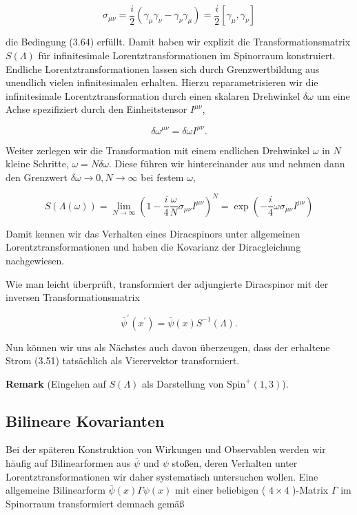 \documentclass[10pt, letterpaper]{article}
\newcommand{\Spin}{\mathrm{Spin}}
\newcommand{\CustomHeading}[3]{%
  \par\medskip\noindent%
  \textbf{#1 #2} \textnormal{(#3)}.\enskip%
}
\newenvironment{REM}[2]{\begin{unitbox}\CustomHeading{Remark}{#1}{#2}}{\end{unitbox}}
\begin{document}
$$
\sigma_{\mu \nu}=\frac{i}{2}\left(\gamma_{\mu} \gamma_{\nu}-\gamma_{\nu} \gamma_{\mu}\right)=\frac{i}{2}\left[\gamma_{\mu}, \gamma_{\nu}\right]
$$

die Bedingung (3.64) erfüllt. Damit haben wir explizit die Transformationsmatrix $S(\Lambda)$ für infinitesimale Lorentztransformationen im Spinorraum konstruiert. Endliche Lorentztransformationen lassen sich durch Grenzwertbildung aus unendlich vielen infinitesimalen erhalten. Hierzu reparametrisieren wir die infinitesimale Lorentztransformation durch einen skalaren Drehwinkel $\delta \omega$ um eine Achse spezifiziert durch den Einheitstensor $I^{\mu \nu}$,

$$
\delta \omega^{\mu \nu}=\delta \omega I^{\mu \nu} .
$$

Weiter zerlegen wir die Transformation mit einem endlichen Drehwinkel $\omega$ in $N$ kleine Schritte, $\omega=N \delta \omega$. Diese führen wir hintereinander aus und nehmen dann den Grenzwert $\delta \omega \rightarrow 0, N \rightarrow \infty$ bei festem $\omega$,

$$
S(\Lambda(\omega))=\lim _{N \rightarrow \infty}\left(1-\frac{i}{4} \frac{\omega}{N} \sigma_{\mu \nu} I^{\mu \nu}\right)^{N}=\exp \left(-\frac{i}{4} \omega \sigma_{\mu \nu} I^{\mu \nu}\right)
$$

Damit kennen wir das Verhalten eines Diracspinors unter allgemeinen Lorentztransformationen und haben die Kovarianz der Diracgleichung nachgewiesen.

Wie man leicht überprüft, transformiert der adjungierte Diracspinor mit der inversen Transformationsmatrix

$$
\bar{\psi}^{\prime}\left(x^{\prime}\right)=\bar{\psi}(x) S^{-1}(\Lambda) .
$$

Nun können wir uns als Nächstes auch davon überzeugen, dass der erhaltene Strom (3.51) tatsächlich als Vierervektor transformiert.

\begin{REM}{}{Eingehen auf $S(\Lambda)$ als Darstellung von $\Spin^+(1,3)$}

\end{REM}

\pagebreak


\subsection{Bilineare Kovarianten}

Bei der späteren Konstruktion von Wirkungen und Observablen werden wir häufig auf Bilinearformen aus $\bar{\psi}$ und $\psi$ stoßen, deren Verhalten unter Lorentztransformationen wir daher systematisch untersuchen wollen. Eine allgemeine Bilinearform $\bar{\psi}(x) \Gamma \psi(x)$ mit einer beliebigen ( $4 \times 4$ )-Matrix $\Gamma$ im Spinorraum transformiert demnach gemäß
\end{document}
